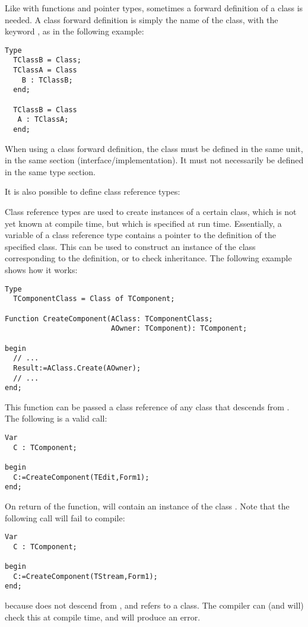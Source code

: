\begin{remark}
Like with functions and pointer types, sometimes a forward definition of a
class is needed. A class forward definition is simply the name of the class,
with the keyword , as in the following example:
\begin{verbatim}
Type
  TClassB = Class;
  TClassA = Class
    B : TClassB;
  end;

  TClassB = Class
   A : TClassA;
  end;
\end{verbatim}
When using a class forward definition, the class must be defined in the same
unit, in the same section (interface/implementation). It must not
necessarily be defined in the same type section.
\end{remark}

It is also possible to define class reference types:

Class reference types are used to create instances of a certain class, which
is not yet known at compile time, but which is specified at run time.
Essentially, a variable of a class reference type contains a pointer to the
definition of the specified class. This can be used to construct an instance
of the class corresponding to the definition, or to check inheritance.
The following example shows how it works:
\begin{verbatim}
Type
  TComponentClass = Class of TComponent;

Function CreateComponent(AClass: TComponentClass;
                         AOwner: TComponent): TComponent;

begin
  // ...
  Result:=AClass.Create(AOwner);
  // ...
end;
\end{verbatim}
This function can be passed a class reference of any class that descends
from . The following is a valid call:
\begin{verbatim}
Var
  C : TComponent;

begin
  C:=CreateComponent(TEdit,Form1);
end;
\end{verbatim}
On return of the  function,  will contain an
instance of the class . Note that the following call will fail to
compile:
\begin{verbatim}
Var
  C : TComponent;

begin
  C:=CreateComponent(TStream,Form1);
end;
\end{verbatim}
because  does not descend from , and
 refers to a  class. The compiler can
(and will) check this at compile time, and will produce an error.

